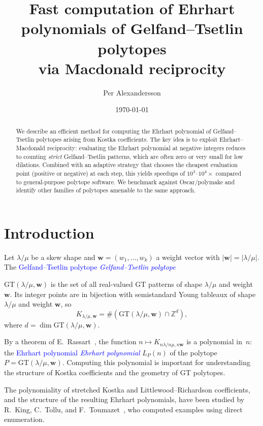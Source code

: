 \documentclass[11pt,reqno]{amsart}
\title[Ehrhart polynomials of GT polytopes via reciprocity]{Fast computation of Ehrhart polynomials of Gelfand--Tsetlin polytopes\\via Macdonald reciprocity}
\author{Per Alexandersson}
\date{\today}
\theoremstyle{definition}
\newcommand{\setZ}{\mathbb{Z}}
\newcommand{\GT}{\mathrm{GT}}
\newcommand{\lam}{\lambda}
\newcommand{\wt}{\mathbf{w}}
\newcommand{\Ehr}{L}
\newcommand{\defin}[1]{%
\relax\ifmmode%
\textcolor{blue}{#1}%
\else \textcolor{blue}{\emph{#1}}%
\fi%
}
\begin{document}
\begin{abstract}
We describe an efficient method for computing the Ehrhart polynomial of
Gelfand--Tsetlin polytopes arising from Kostka coefficients.
The key idea is to exploit Ehrhart--Macdonald reciprocity: evaluating
the Ehrhart polynomial at negative integers reduces to counting
\emph{strict} Gelfand--Tsetlin patterns, which are often zero or very
small for low dilations.  Combined with an adaptive strategy that chooses
the cheapest evaluation point (positive or negative) at each step, this
yields speedups of $10^3$--$10^4\times$ compared to general-purpose
polytope software.  We benchmark against Oscar/polymake
 and identify other families of polytopes amenable to the same approach.
\end{abstract}

\maketitle

\section{Introduction}\label{sec:introduction}

Let $\lam/\mu$ be a skew shape and $\wt = (w_1, \dotsc, w_k)$ a weight
vector with $|\wt| = |\lam/\mu|$.  The \defin{Gelfand--Tsetlin polytope}
$\GT(\lam/\mu, \wt)$ is the set of all real-valued GT patterns of shape
$\lam/\mu$ and weight $\wt$.  Its integer points are in bijection with
semistandard Young tableaux of shape $\lam/\mu$ and weight $\wt$, so
\begin{equation}\label{eq:kostka}
  K_{\lam/\mu, \wt} = \#(\GT(\lam/\mu, \wt) \cap \setZ^d),
\end{equation}
where $d = \dim \GT(\lam/\mu, \wt)$.

By a theorem of E.~Rassart~\cite{Rassart2004}, the function
$n \mapsto K_{n\lam/n\mu, n\wt}$ is a polynomial in~$n$: the
\defin{Ehrhart polynomial} $\Ehr_P(n)$ of the polytope $P = \GT(\lam/\mu, \wt)$.
Computing this polynomial is important for understanding the structure of
Kostka coefficients and the geometry of GT polytopes.

The polynomiality of stretched Kostka and Littlewood--Richardson
coefficients, and the structure of the resulting Ehrhart polynomials,
have been studied by R.~King, C.~Tollu, and
F.~Toumazet~\cite{KingTolluToumazet2004}, who computed examples using
direct enumeration.
\end{document}
